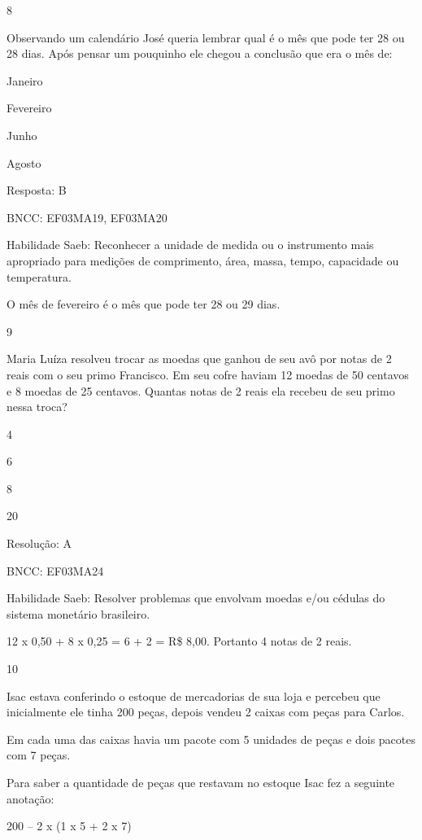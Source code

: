 \begin{escolha}
\num{8}

Observando um calendário José queria lembrar qual é o mês que pode ter
28 ou 28 dias. Após pensar um pouquinho ele chegou a conclusão que era o
mês de:

\begin{escolha}
\item
  Janeiro
\item
  Fevereiro
\item
  Junho
\item
  Agosto
\end{escolha}

Resposta: B

BNCC: EF03MA19, EF03MA20

Habilidade Saeb: Reconhecer a unidade de medida ou o instrumento mais
apropriado para medições de comprimento, área, massa, tempo, capacidade
ou temperatura.

O mês de fevereiro é o mês que pode ter 28 ou 29 dias.

\num{9}

Maria Luíza resolveu trocar as moedas que ganhou de seu avô por notas de
2 reais com o seu primo Francisco. Em seu cofre haviam 12 moedas de 50
centavos e 8 moedas de 25 centavos. Quantas notas de 2 reais ela recebeu
de seu primo nessa troca?

\begin{escolha}
\item
  4
\item
  6
\item
  8
\item
  20
\end{escolha}

Resolução: A

BNCC: EF03MA24

Habilidade Saeb: Resolver problemas que envolvam moedas e/ou cédulas do
sistema monetário brasileiro.

12 x 0,50 + 8 x 0,25 = 6 + 2 = R\$ 8,00. Portanto 4 notas de 2 reais.

\num{10}

Isac estava conferindo o estoque de mercadorias de sua loja e percebeu
que inicialmente ele tinha 200 peças, depois vendeu 2 caixas com peças
para Carlos.

Em cada uma das caixas havia um pacote com 5 unidades de peças e dois
pacotes com 7 peças.

Para saber a quantidade de peças que restavam no estoque Isac fez a
seguinte anotação:

200 -- 2 x (1 x 5 + 2 x 7)


\end{escolha}
